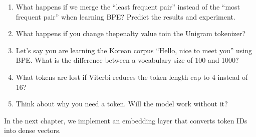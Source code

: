 \begin{enumerate}
\item What happens if we merge the ``least frequent pair'' instead of the ``most frequent pair'' when learning BPE? Predict the results and experiment.
\item What happens if you change thepenalty value toin the Unigram tokenizer?
\item Let’s say you are learning the Korean corpus ``Hello, nice to meet you'' using BPE. What is the difference between a vocabulary size of 100 and 1000?
\item What tokens are lost if Viterbi reduces the token length cap to 4 instead of 16?
\item{}Think about why you need a token. Will the model work without it?
\end{enumerate}

In the next chapter, we implement an embedding layer that converts token IDs into dense vectors.
